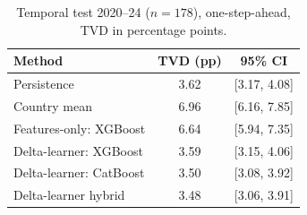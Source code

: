 \begin{table}
\caption{Temporal test 2020--24 ($n=178$), one-step-ahead, TVD in percentage points.}\label{tab:A1}
\centering\footnotesize\setlength{\tabcolsep}{3pt}
\renewcommand{\arraystretch}{1.1}

\begin{tabular}{lcc}
\toprule
Method & TVD (pp) & 95\% CI \\
\midrule
Persistence & 3.62 & [3.17, 4.08] \\
Country mean & 6.96 & [6.16, 7.85] \\
Features-only: XGBoost & 6.64 & [5.94, 7.35] \\
Delta-learner: XGBoost & 3.59 & [3.15, 4.06] \\
Delta-learner: CatBoost & 3.50 & [3.08, 3.92] \\
Delta-learner hybrid & 3.48 & [3.06, 3.91] \\
\bottomrule
\end{tabular}
\end{table}
